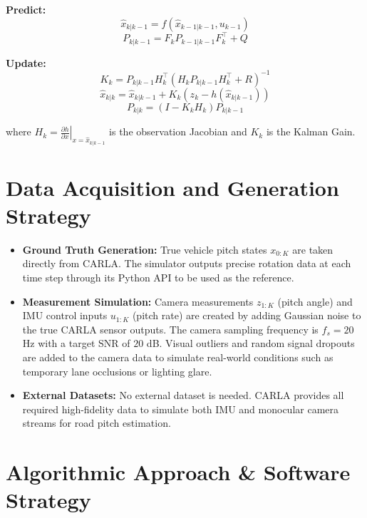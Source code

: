 \documentclass[12pt]{article}
\begin{document}
\textbf{Predict:}
\begin{equation}
\hat{x}_{k|k-1} = f(\hat{x}_{k-1|k-1}, u_{k-1})
\end{equation}
\begin{equation}
P_{k|k-1} = F_k P_{k-1|k-1} F_k^\top + Q
\end{equation}

\textbf{Update:}
\begin{equation}
K_k = P_{k|k-1} H_k^\top (H_k P_{k|k-1} H_k^\top + R)^{-1}
\end{equation}
\begin{equation}
\hat{x}_{k|k} = \hat{x}_{k|k-1} + K_k (z_k - h(\hat{x}_{k|k-1}))
\end{equation}
\begin{equation}
P_{k|k} = (I - K_k H_k) P_{k|k-1}
\end{equation}

where $H_k = \left. \frac{\partial h}{\partial x} \right|_{x=\hat{x}_{k|k-1}}$ is the observation Jacobian and $K_k$ is the Kalman Gain.

\section{Data Acquisition and Generation Strategy}

\begin{itemize}
    \item \textbf{Ground Truth Generation:} True vehicle pitch states $x_{0:K}$ are taken directly from CARLA. The simulator outputs precise rotation data at each time step through its Python API to be used as the reference.
    
    \item \textbf{Measurement Simulation:} Camera measurements $z_{1:K}$ (pitch angle) and IMU control inputs $u_{1:K}$ (pitch rate) are created by adding Gaussian noise to the true CARLA sensor outputs. The camera sampling frequency is $f_s = 20$ Hz with a target SNR of $20$ dB. Visual outliers and random signal dropouts are added to the camera data to simulate real-world conditions such as temporary lane occlusions or lighting glare.
    
    \item \textbf{External Datasets:} No external dataset is needed. CARLA provides all required high-fidelity data to simulate both IMU and monocular camera streams for road pitch estimation.
\end{itemize}
  

\section{Algorithmic Approach \& Software Strategy}
\end{document}
